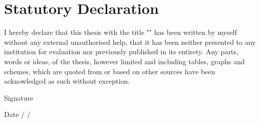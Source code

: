 \cleardoublepage


\chapter*{Statutory Declaration}

I hereby declare that this thesis with the title "\textbf{\textit{\inserttitle}}" has been written by myself without any external unauthorised help, that it has been neither presented to any institution for evaluation nor previously published in its entirety. Any parts, words or ideas, of the thesis, however limited and including tables, graphs and schemes, which are quoted from or based on other sources have been acknowledged as such without exception.

\vskip 0.5in 
  \normalsize {Signature \underline{\hspace{1.5in}}}
  
  \vskip 0.1in
  \normalsize {Date \underline{\hspace{0.5in}} / \underline{\hspace{0.5in}} / \underline{\hspace{0.5in}}}
